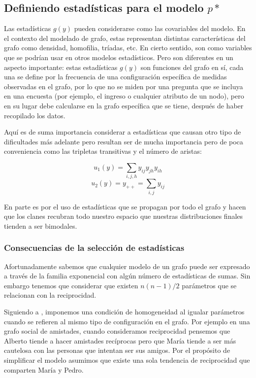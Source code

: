 \subsection{Definiendo estadísticas para el modelo $p*$}

Las estadísticas $g(y)$ pueden considerarse como las covariables del modelo. En el contexto del modelado de grafo, estas representan distintas características del grafo como densidad, homofilia, tríadas, etc. En cierto sentido, son como variables que se podrían usar en otros modelos estadísticos. Pero son diferentes en un aspecto importante: estas estadísticas $g(y)$ son funciones del grafo en sí, cada una se define por la frecuencia de una configuración específica de medidas observadas en el grafo, por lo que no se miden por una pregunta que se incluya en una encuesta (por ejemplo, el ingreso o cualquier atributo de un nodo), pero en su lugar debe calcularse en la grafo específica que se tiene, después de haber recopilado los datos.

Aquí es de suma importancia considerar a estadísticas que causan otro tipo de dificultades más adelante pero resultan ser de mucha importancia pero de poca conveniencia como las tripletas transitivas y el número de aristas:

$$u_{1}(y)=\sum_{i, j, h} y_{i j} y_{j h} y_{i h}$$
$$u_{2}(y)=y_{++}=\sum_{i, j} y_{i j}$$



En parte es por el uso de estadísticas que se propagan por todo el grafo y hacen que los clanes recubran todo nuestro espacio que nuestras distribuciones finales tienden a ser bimodales. 




\subsubsection{Consecuencias de la selección de estadísticas}

Afortunadamente sabemos que cualquier modelo de un grafo puede ser expresado a través de la familia exponencial con algún número de estadísticas de sumas. Sin embargo tenemos que considerar que existen $n(n-1)/2$ parámetros que se relacionan con la reciprocidad. 

Siguiendo a \cite{Snidjers2010}, imponemos una condición de homogeneidad al igualar parámetros cuando se refieren al mismo tipo de configuración en el grafo. Por ejemplo en una grafo social de amistades, cuando consideramos reciprocidad pensemos que Alberto tiende a hacer amistades recíprocas pero que María tiende a ser más cautelosa con las personas que intentan ser sus amigos. Por el propósito de simplificar el modelo asumimos que existe una sola tendencia de reciprocidad que comparten María y Pedro.

